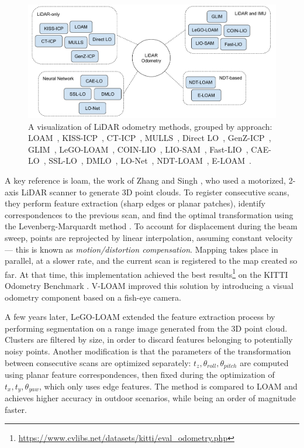 \begin{figure}
    \centering
    \includegraphics[width=0.6\linewidth]{images/lidar-odometry-tree.pdf}
    \caption[LiDAR Odometry Approaches]{A visualization of LiDAR odometry methods, grouped by approach: LOAM~\cite{zhang2014loam}, KISS-ICP~\cite{vizzo2023ral},  CT-ICP~\cite{dellenbach2021cticp}, MULLS~\cite{pan2021mulls}, Direct LO~\cite{chen2022directlo}, GenZ-ICP~\cite{lee2024genz}, GLIM~\cite{koide2024glim}, LeGO-LOAM~\cite{legoloam2018}, COIN-LIO~\cite{pfreundschuh2024coin}, LIO-SAM~\cite{shan2020lio}, Fast-LIO~\cite{fastlio}, CAE-LO~\cite{caelo2020}, SSL-LO~\cite{nubert2021self}, DMLO~\cite{li2020dmlo}, LO-Net~\cite{li2019net}, NDT-LOAM~\cite{chen2021ndt}, E-LOAM~\cite{guo2022loam}.}
    \label{fig:lidar-odometry-family}
\end{figure}


A key reference is \acrfull{loam}, the work of Zhang and Singh \cite{zhang2014loam}, who used a motorized, 2-axis LiDAR scanner to generate 3D point clouds. To register consecutive scans, they perform feature extraction (sharp edges or planar patches), identify correspondences to the previous scan, and find the optimal transformation using the Levenberg-Marquardt method \cite{levenberg1944method,marquardt}. To account for displacement during the beam sweep, points are reprojected by linear interpolation, assuming constant velocity --- this is known as \emph{motion/distortion compensation}. Mapping takes place in parallel, at a slower rate, and the current scan is registered to the map created so far. At that time, this implementation achieved the best results\footnote{\url{https://www.cvlibs.net/datasets/kitti/eval_odometry.php}} on the KITTI Odometry Benchmark \cite{geiger2012kitti}. V-LOAM \cite{zhang2015visual} improved this solution by introducing a visual odometry component based on a fish-eye camera.

A few years later, LeGO-LOAM \cite{legoloam2018} extended the feature extraction process by performing segmentation on a range image generated from the 3D point cloud. Clusters are filtered by size, in order to discard features belonging to potentially noisy points. Another modification is that the parameters of the transformation between consecutive scans are optimized separately: $t_z, \theta_{roll}, \theta_{pitch}$ are computed using planar feature correspondences, then fixed during the optimization of $t_x, t_y, \theta_{yaw}$, which only uses edge features. The method is compared to LOAM and achieves higher accuracy in outdoor scenarios, while being an order of magnitude faster.

